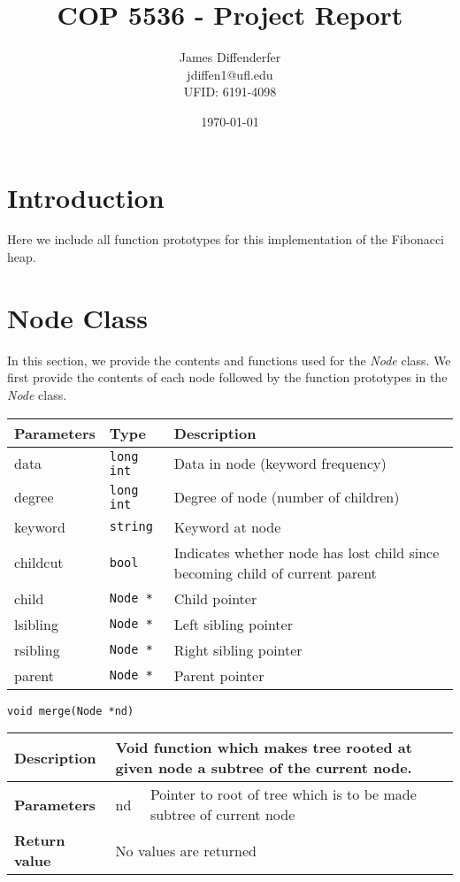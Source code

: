 \documentclass[12pt, reqno]{amsart}
\title{COP 5536 - Project Report}
\author[James Diffenderfer]{James Diffenderfer \\ jdiffen1@ufl.edu \\ UFID: 6191-4098}
\date{\today}
\begin{document}
\maketitle

\section*{Introduction}

Here we include all function prototypes for this implementation of the Fibonacci heap.

\section*{Node Class}
In this section, we provide the contents and functions used for the \emph{Node} class. We first provide the contents of each node followed by the function prototypes in the \emph{Node} class. 

\begin{center}
    \begin{tabular}{| l | l | p{11cm} |}
    \hline
    {\bfseries Parameters} & {\bfseries Type} & {\bfseries Description} \\ \hline
    data & \texttt{long int} & Data in node (keyword frequency) \\ \hline
    degree & \texttt{long int} & Degree of node (number of children) \\ \hline
    keyword & \texttt{string} & Keyword at node \\ \hline
    childcut & \texttt{bool} & Indicates whether node has lost child since becoming child of current parent \\ \hline
    child & \texttt{Node *} & Child pointer \\ \hline
    lsibling & \texttt{Node *} & Left sibling pointer \\ \hline
    rsibling & \texttt{Node *} & Right sibling pointer \\ \hline
    parent & \texttt{Node *} & Parent pointer \\ \hline
    \end{tabular}
\end{center}
\vspace{2mm}


{\large \texttt{void merge(Node *nd)}}
\begin{center}
    \begin{tabular}{| l | p{2.5cm} | p{9.5cm} |}
    \hline
    {\bfseries Description} & \multicolumn{2}{p{12.5cm}|}{Void function which makes tree rooted at given node a subtree of the current node.} \\ \hline
    \multirow{1}{*}{\bfseries Parameters} & nd & Pointer to root of tree which is to be made subtree of current node \\ \hline
    {\bfseries Return value} & \multicolumn{2}{p{12.5cm}|}{No values are returned} \\ \hline
    \end{tabular}
\end{center}
\end{document}
